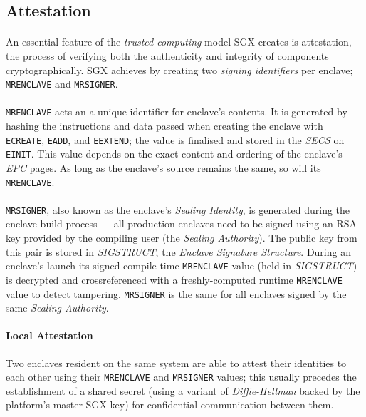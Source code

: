 \subsection{Attestation}
\label{sec:attestation}

\paragraph{} An essential feature of the \textit{trusted computing} model SGX creates is attestation, the process of verifying both the authenticity and integrity of components cryptographically. SGX achieves by creating two \textit{signing identifiers} per enclave; \texttt{MRENCLAVE} and \texttt{MRSIGNER}.~\cite{Anati2013InnovativeTF,sgx-prov-service}

\paragraph{} \texttt{MRENCLAVE} acts an a unique identifier for enclave's contents. It is generated by hashing the instructions and data passed when creating the enclave with \texttt{ECREATE}, \texttt{EADD}, and \texttt{EEXTEND}; the value is finalised and stored in the \textit{SECS} on \texttt{EINIT}. This value depends on the exact content and ordering of the enclave's \textit{EPC} pages. As long as the enclave's source remains the same, so will its \texttt{MRENCLAVE}.

\paragraph{} \texttt{MRSIGNER}, also known as the enclave's \textit{Sealing Identity}, is generated during the enclave build process --- all production enclaves need to be signed using an RSA key provided by the compiling user (the \textit{Sealing Authority}). The public key from this pair is stored in \textit{SIGSTRUCT}, the \textit{Enclave Signature Structure}. During an enclave's launch its signed compile-time \texttt{MRENCLAVE} value (held in \textit{SIGSTRUCT}) is decrypted and crossreferenced with a freshly-computed runtime \texttt{MRENCLAVE} value to detect tampering. \texttt{MRSIGNER} is the same for all enclaves signed by the same \textit{Sealing Authority}.

\paragraph{Local Attestation} Two enclaves resident on the same system are able to attest their identities to each other using their \texttt{MRENCLAVE} and \texttt{MRSIGNER} values; this usually precedes the establishment of a shared secret (using a variant of \textit{Diffie-Hellman} backed by the platform's master SGX key) for confidential communication between them.

